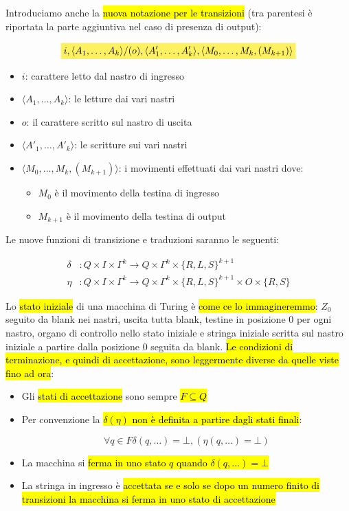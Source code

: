 \documentclass[a4paper,11pt,oneside]{article}
\theoremstyle{plain}
\theoremstyle{definition}
\theoremstyle{remark}
\newcommand{\mhl}[1]{\colorbox{hlcolor}{$\displaystyle #1$}}
\begin{document}
Introduciamo anche la \hl{nuova notazione per le transizioni} (tra parentesi è
riportata la parte aggiuntiva nel caso di presenza di output):

\[
  \mhl{
  i, \langle A_1, \ldots, A_k \rangle/(o),
    \langle A'_1, \ldots, A'_k \rangle,
    \langle M_0, \ldots, M_k, (M_{k+1}) \rangle
  }
\]

\begin{itemize}
  \item $i$: carattere letto dal nastro di ingresso
  \item $\langle A_1, \ldots, A_k \rangle$: le letture dai vari nastri
  \item $o$: il carattere scritto sul nastro di uscita
  \item $\langle A'_1, \ldots, A'_k \rangle$: le scritture sui vari nastri
  \item $\langle M_0, \ldots, M_k, (M_{k+1}) \rangle$: i movimenti effettuati
    dai vari nastri dove:
    \begin{itemize}
      \item $M_0$ è il movimento della testina di ingresso
      \item $M_{k+1}$ è il movimento della testina di output
    \end{itemize}
\end{itemize}

Le nuove funzioni di transizione e traduzioni saranno le seguenti:

\begin{align}
  \delta&: Q \times I \times \Gamma^k \to
    Q \times \Gamma^k \times {\{R,L,S\}}^{k+1} \\
  \eta&: Q \times I \times \Gamma^k \to
    Q \times \Gamma^k \times {\{R,L,S\}}^{k+1} \times O \times \{R,S\}
\end{align}

Lo \hl{stato iniziale} di una macchina di Turing è \hl{come ce lo
immagineremmo}: $Z_0$ seguito da blank nei nastri, uscita tutta blank, testine
in posizione 0 per ogni nastro, organo di controllo nello stato iniziale e
stringa iniziale scritta sul nastro iniziale a partire dalla posizione 0 seguita
da blank. \hl{Le condizioni di terminazione, e quindi di accettazione, sono
leggermente diverse da quelle viste fino ad ora}:

\begin{itemize}
  \item Gli \hl{stati di accettazione} sono sempre \hl{$F \subseteq Q$}
  \item Per convenzione la \hl{$\delta (\eta)$ non è definita a partire dagli
    stati finali}:

    \[
      \forall q \in F \delta(q, \ldots) = \bot, (\eta (q, \ldots) = \bot)
    \]

  \item La macchina si \hl{ferma in uno stato $q$ quando
    $\delta(q, \ldots) = \bot$}
  \item La stringa in ingresso è \hl{accettata se e solo se dopo un numero
    finito di transizioni la macchina si ferma in uno stato di accettazione}
\end{itemize}
\end{document}
